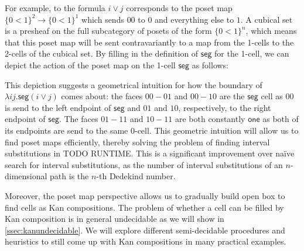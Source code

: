 \documentclass[11pt]{article}
\theoremstyle{definition}
\newcommand{\cset}[1]{\ensuremath{\mathsf{{#1}}}}
\begin{document}
For example, to the formula $i \vee j$ corresponds to the poset map $\{ 0<1 \}^2
\to \{ 0<1 \}^1$ which sends $00$ to $0$ and everything else to $1$. A cubical set
is a presheaf on the full subcategory of posets of the form $\{ 0<1 \}^n$, which
means that this poset map will be sent contravariantly to a map from the 1-cells
to the 2-cells of the cubical set. By filling in the definition of \cset{seg}
for the 1-cell, we can depict the action of the poset map on the 1-cell
\cset{seg} as follows:
\begin{center}
\end{center}

This depiction suggests a geometrical intuition for how the boundary of $\lambda i
j.\cset{seg} (i \vee j)$ comes about: the faces $00-01$ and $00-10$ are the
\cset{seg} cell as $00$ is send to the left endpoint of \cset{seg} and $01$ and
$10$, respectively, to the right endpoint of \cset{seg}. The faces $01-11$ and $10-11$
are both constantly \cset{one} as both of its endpoints are send to the same
0-cell. This geometric intuition will allow us to find poset maps
efficiently, thereby solving the problem of finding interval substitutions in
TODO RUNTIME. This is a significant improvement over na\"ive search for
interval substitutions, as the number of interval substitutions of an
$n$-dimensional path is the $n$-th Dedekind number.

Moreover, the poset map perspective allows us to gradually build open box to
find cells as Kan compositions. The problem of whether a cell can be filled by
Kan composition is in general undecidable as we will show in
\autoref{ssec:kanundecidable}. We will explore different semi-decidable
procedures and heuristics to still come up with Kan compositions in many
practical examples.
\end{document}

